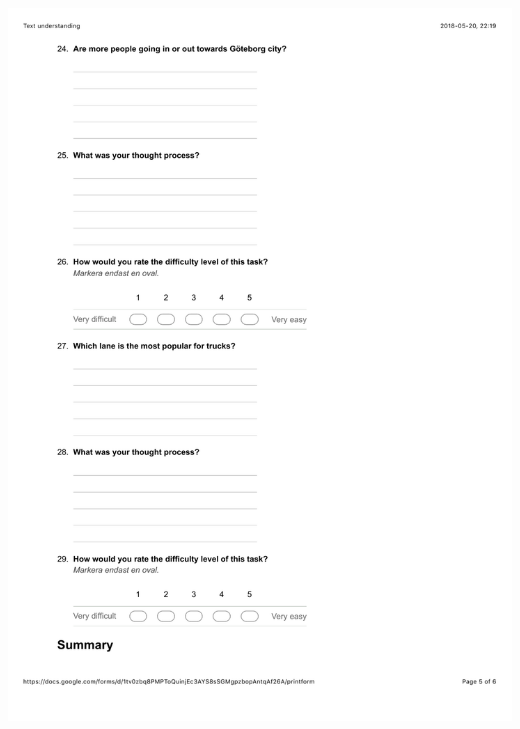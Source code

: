\documentclass[12pt]{kththesis}
\begin{document}
\begin{appendices}
\includegraphics[width=1\textwidth]{TextUnderstanding5.pdf}

\end{appendices}
\end{document}
